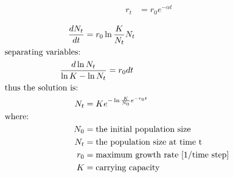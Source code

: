 \documentclass[12pt]{article}
\begin{document}
\begin{align}
r_{t} & = r_{0}e^{-\alpha t} \nonumber
\end{align} 

\begin{align}
\dfrac{dN_{t}}{dt} & = r_{0}\ln \frac{K}{N_{t}}N_{t} \nonumber \\
&    \hspace{-1.3in}  \text{separating variables:} \nonumber \\
&    \hspace{-0.4in} \frac{d \ln N_{t}}{\ln K - \ln N_{t} } = r_{0}dt \nonumber\\
&    \hspace{-1.3in}  \text{thus the solution is:} \nonumber \\
N_{t} & =K e^{-\ln \frac{K}{N_{0}}e^{-r_{0}t}} \nonumber\\
&    \hspace{-1.3in}  \text{where:} \nonumber \\
N_{0} & = \text{the initial population size} \nonumber \\
N_{t} & = \text{the population size at time t} \nonumber \\
r_{0} & = \text{maximum growth rate [1/time step]} \nonumber \\
K & = \text{carrying capacity} \nonumber
\end{align} 
\end{document}
